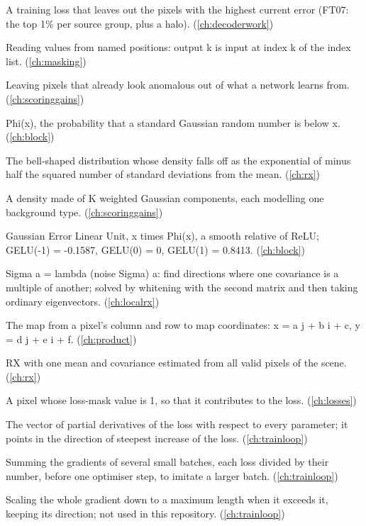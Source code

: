 \begin{description}[style=nextline,leftmargin=1.2em,font=\normalfont\bfseries]
\item[Gated loss] A training loss that leaves out the pixels with the highest current error (FT07: the top 1\% per source group, plus a halo). (\cref{ch:decoderwork})
\item[Gather] Reading values from named positions: output k is input at index k of the index list. (\cref{ch:masking})
\item[Gating] Leaving pixels that already look anomalous out of what a network learns from. (\cref{ch:scoringgains})
\item[Gaussian cumulative distribution function] Phi(x), the probability that a standard Gaussian random number is below x. (\cref{ch:block})
\item[Gaussian distribution] The bell-shaped distribution whose density falls off as the exponential of minus half the squared number of standard deviations from the mean. (\cref{ch:rx})
\item[Gaussian mixture] A density made of K weighted Gaussian components, each modelling one background type. (\cref{ch:scoringgains})
\item[GELU] Gaussian Error Linear Unit, x times Phi(x), a smooth relative of ReLU; GELU(-1) = -0.1587, GELU(0) = 0, GELU(1) = 0.8413. (\cref{ch:block})
\item[Generalised eigenproblem] Sigma a = lambda (noise Sigma) a: find directions where one covariance is a multiple of another; solved by whitening with the second matrix and then taking ordinary eigenvectors. (\cref{ch:localrx})
\item[Geotransform (affine)] The map from a pixel's column and row to map coordinates: x = a j + b i + c, y = d j + e i + f. (\cref{ch:product})
\item[Global RX] RX with one mean and covariance estimated from all valid pixels of the scene. (\cref{ch:rx})
\item[Graded pixel] A pixel whose loss-mask value is 1, so that it contributes to the loss. (\cref{ch:losses})
\item[Gradient] The vector of partial derivatives of the loss with respect to every parameter; it points in the direction of steepest increase of the loss. (\cref{ch:trainloop})
\item[Gradient accumulation] Summing the gradients of several small batches, each loss divided by their number, before one optimiser step, to imitate a larger batch. (\cref{ch:trainloop})
\item[Gradient clipping] Scaling the whole gradient down to a maximum length when it exceeds it, keeping its direction; not used in this repository. (\cref{ch:trainloop})

\end{description}
